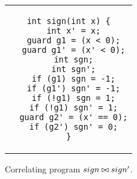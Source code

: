\begin{figure}[H]
\centering
\begin{tabular}{c}
\begin{lstlisting}
int sign(int x) {
  int x' = x;
  guard g1 = (x < 0);
  guard g1' = (x' < 0);
  int sgn;
  int sgn';
  if (g1) sgn = -1;
  if (g1') sgn' = -1;
  if (!g1) sgn = 1;
  if (!g1) sgn' = 1;
  guard g2' = (x' == 0);
  if (g2') sgn' = 0;
}
\end{lstlisting}
\end{tabular}
\caption{Correlating program $sign \bowtie sign'$.}
\end{figure}
